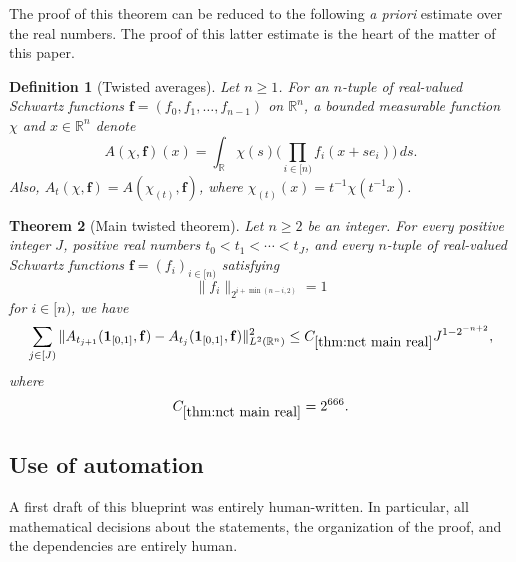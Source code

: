 \documentclass[12pt,reqno]{amsart}
\theoremstyle{plain}
\newtheorem{theorem}{Theorem}[section]
\newtheorem{definition}[theorem]{Definition}
\numberwithin{equation}{section}
\theoremstyle{remark}
\newcommand{\uses}[1]{}
\newcommand{\usesdefs}[1]{}
\newcommand{\R}{{\mathbb R}}
\begin{document}
The proof of this theorem can be reduced to the following {\em a priori} estimate over the real numbers. The proof of this latter estimate is the heart of the matter of this paper.

\begin{definition}[Twisted averages]
Let $n\geq 1$. For an $n$-tuple of real-valued Schwartz functions $\mathbf f = (f_0,f_1,\dots,f_{n-1})$ on $\R^n$, a bounded measurable function $\chi$ and $x\in\mathbb{R}^n$ denote
\begin{equation}\label{A_def}\uses{}\usesdefs{}
A(\chi,\mathbf f)(x) = \int_{\mathbb{R}} \chi(s)\Big(\prod_{i\in [n)} f_i(x+se_i)\Big)\,ds.
\end{equation}
Also, $A_t(\chi,\mathbf{f})=A(\chi_{(t)},\mathbf{f})$, where $\chi_{(t)}(x)=t^{-1}\chi(t^{-1}x)$.
\end{definition}

\begin{theorem}[Main twisted theorem]\label{thm:nct main real}\uses{lem:smoothingdecomp,lem:norm_A_sum_le_sum,lem:mainbump1,lem:mainbump2,lem:leftbump,lem:leftbump1,constant main bump one,constant main bump two,constant left bump,constant left bump one}\usesdefs{A_def,defn:window based bump functions}
Let $n\ge 2$ be an integer. For every positive integer $J$, positive real numbers $t_0<t_1<\cdots<t_J$, and every $n$-tuple of real-valued Schwartz functions ${\mathbf f}=(f_i)_{i\in[n)}$ satisfying
\begin{equation}\label{main twisted normalization}
\|f_i\|_{2^{i+\min(n-i,2)}}=1
\end{equation}
for $i\in[n)$, we have
\begin{equation}\label{e:ncommuting_real}
\sum_{j\in[J)}\|A_{t_{j+1}}(\mathbf 1_{[0,1]},\mathbf f)-A_{t_j}(\mathbf 1_{[0,1]},\mathbf f)\|_{L^2(\R^n)}^2
\le C_{\ref{thm:nct main real}}J^{1-2^{-n+2}},
\end{equation}
where
\begin{equation}\label{main twisted theorem constant}
C_{\ref{thm:nct main real}}=2^{666}.
\end{equation}
\end{theorem}

\subsection{Use of automation}\label{sec:comments-on-automation}
A first draft of this blueprint was entirely human-written.
In particular, all mathematical decisions about the statements, the organization of the proof, and the dependencies are entirely human.
\end{document}
